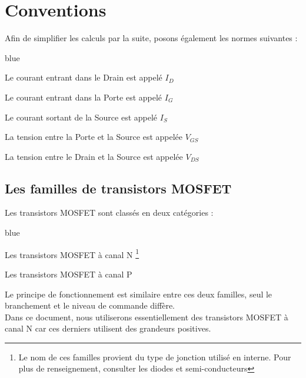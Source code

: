      \section{Conventions}
     
     Afin de simplifier les calculs par la suite, posons également les normes suivantes : 
     
     \begin{items}{blue}{\Triangle}
     
       \item Le courant entrant dans le Drain est appelé $I_{D}$
       \item Le courant entrant dans la Porte est appelé $I_{G}$
       \item Le courant sortant de la Source est appelé $I_{S}$

       \item La tension entre la Porte et la Source est appelée $V_{GS}$
       \item La tension entre le Drain et la Source est appelée $V_{DS}$
     \end{items}
     
     \subsection{Les familles de transistors MOSFET}

     Les transistors MOSFET sont classés en deux catégories : 
     
     \begin{items}{blue}{\Triangle}
     
       \item Les transistors MOSFET à canal N \footnote{Le nom de ces familles provient du type de jonction utilisé en interne. Pour plus de renseignement, consulter les diodes et semi-conducteurs}
       \item Les transistors MOSFET à canal P
     
     \end{items}
     
     Le principe de fonctionnement est similaire entre ces deux familles, seul le branchement et le niveau de commande diffère.\\
     Dans ce document, nous utiliserons essentiellement des transistors MOSFET à canal N car ces derniers utilisent des grandeurs 
     positives.
     

